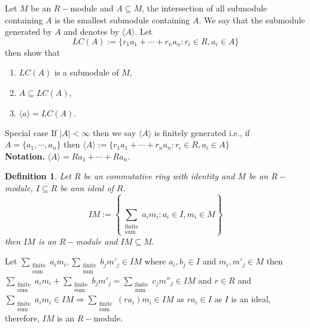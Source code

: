 \documentclass[11pt]{amsart}
\newtheorem{defn}[theorem]{Definition}
\newcommand{\gen}[1]{\langle#1\rangle}
\begin{document}
Let $M$ be an $R-$module and $A\subseteq M$, the intersection of all submodule containing $A$ is the smallest submodule containing $A$. We say that the submodule generated by $A$ and denotes by $\gen{A}$. Let $$LC(A):=
\{r_1a_1+\cdots +r_na_n:r_i\in R,a_i\in A\}$$ then show that \begin{enumerate}
\item $LC(A)$ is a submodule of $M$,
\item $A\subseteq LC(A)$,
\item $\gen{a}= LC(A).$
\end{enumerate}
Special case If $|A|<\infty$ then we say $
\gen{A}$ is finitely generated i.e., if $A=\{a_1,\cdots ,a_n\}$ then $\gen{A}:=\{r_1a_1+\cdots +r_na_n:r_i\in R,a_i\in A\}$\\
\textbf{Notation.} $\gen{A}=Ra_1+\cdots +Ra_n.$
\begin{defn}
Let $R$ be an commutative ring with identity and $M$ be an $R-$module, $I\subseteq R$ be ann ideal of $R$. $$IM:=\left\lbrace \displaystyle\sum_{\substack{\text{finite}\\ \text{sum}}} a_im_i:a_i\in I,m_i\in M \right\rbrace$$ then $IM$ is an $R-$module and $IM\subseteq M.$
\end{defn}
Let $\displaystyle\sum_{\substack{\text{finite}\\ \text{sum}}} a_im_i,\displaystyle\sum_{\substack{\text{finite}\\ \text{sum}}} b_jm'_j\in IM$ where $a_i,b_j\in I$ and $m_i,m'_j\in M$ then $\displaystyle\sum_{\substack{\text{finite}\\ \text{sum}}} a_im_i+\displaystyle\sum_{\substack{\text{finite}\\ \text{sum}}} b_jm'_j=\displaystyle\sum_{\substack{\text{finite}\\ \text{sum}}} c_jm''_j\in IM$ and $r\in R$ and $\displaystyle\sum_{\substack{\text{finite}\\ \text{sum}}} a_im_i\in IM \Rightarrow \displaystyle\sum_{\substack{\text{finite}\\ \text{sum}}} (ra_i)m_i\in IM$ as $ra_i\in I$ as $I$ is an ideal, therefore, $IM$ is an $R-$module.
\end{document}
